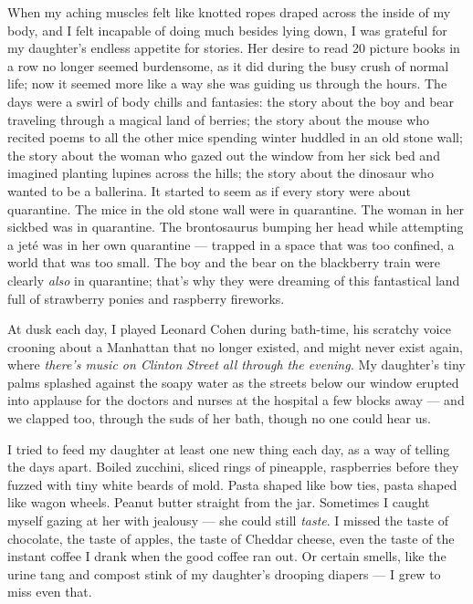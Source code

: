 When my aching muscles felt like knotted ropes draped across the inside
of my body, and I felt incapable of doing much besides lying down, I was
grateful for my daughter's endless appetite for stories. Her desire to
read 20 picture books in a row no longer seemed burdensome, as it did
during the busy crush of normal life; now it seemed more like a way she
was guiding us through the hours. The days were a swirl of body chills
and fantasies: the story about the boy and bear traveling through a
magical land of berries; the story about the mouse who recited poems to
all the other mice spending winter huddled in an old stone wall; the
story about the woman who gazed out the window from her sick bed and
imagined planting lupines across the hills; the story about the dinosaur
who wanted to be a ballerina. It started to seem as if every story were
about quarantine. The mice in the old stone wall were in quarantine. The
woman in her sickbed was in quarantine. The brontosaurus bumping her
head while attempting a jeté was in her own quarantine --- trapped in a
space that was too confined, a world that was too small. The boy and the
bear on the blackberry train were clearly \emph{also} in quarantine;
that's why they were dreaming of this fantastical land full of
strawberry ponies and raspberry fireworks.

At dusk each day, I played Leonard Cohen during bath-time, his scratchy
voice crooning about a Manhattan that no longer existed, and might never
exist again, where \emph{there's music on Clinton Street all through the
evening.} My daughter's tiny palms splashed against the soapy water as
the streets below our window erupted into applause for the doctors and
nurses at the hospital a few blocks away --- and we clapped too, through
the suds of her bath, though no one could hear us.

I tried to feed my daughter at least one new thing each day, as a way of
telling the days apart. Boiled zucchini, sliced rings of pineapple,
raspberries before they fuzzed with tiny white beards of mold. Pasta
shaped like bow ties, pasta shaped like wagon wheels. Peanut butter
straight from the jar. Sometimes I caught myself gazing at her with
jealousy --- she could still \emph{taste}. I missed the taste of
chocolate, the taste of apples, the taste of Cheddar cheese, even the
taste of the instant coffee I drank when the good coffee ran out. Or
certain smells, like the urine tang and compost stink of my daughter's
drooping diapers --- I grew to miss even that.

